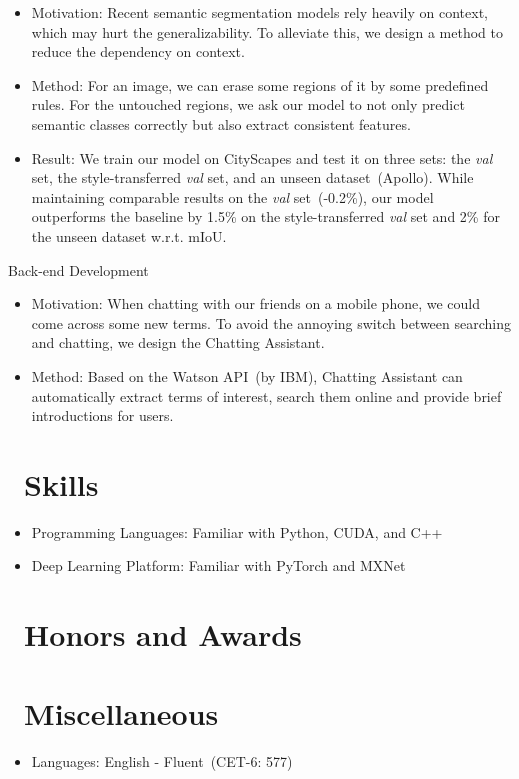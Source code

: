 \documentclass{resume}
\begin{document}
\begin{itemize}
	\item Motivation: Recent semantic segmentation models rely heavily on context, which may hurt the generalizability. To alleviate this, we design a method to reduce the dependency on context.
	\item Method: For an image, we can erase some regions of it by some predefined rules. For the untouched regions, we ask our model to not only predict semantic classes correctly but also extract consistent features.
	\item Result: We train our model on CityScapes and test it on three sets: the \textit{val} set, the style-transferred \textit{val} set, and an unseen dataset~(Apollo). While maintaining comparable results on the \textit{val} set~(-0.2\%), our model outperforms the baseline by 1.5\% on the style-transferred \textit{val} set and 2\% for the unseen dataset w.r.t. mIoU.
\end{itemize}

 {Back-end Development}
\begin{itemize}
	\item Motivation: When chatting with our friends on a mobile phone, we could come across some new terms. To avoid the annoying switch between searching and chatting, we design the Chatting Assistant. 
	\item Method: Based on the Watson API~(by IBM), Chatting Assistant can automatically extract terms of interest, search them online and provide brief introductions for users.
\end{itemize}



\section{\faCogs\ Skills}
\begin{itemize}[parsep=0.5ex]
  \item Programming Languages: Familiar with Python, CUDA, and C++
  \item Deep Learning Platform: Familiar with PyTorch and MXNet
\end{itemize}

\section{\faHeartO\ Honors and Awards}

\section{\faInfo\ Miscellaneous}
\begin{itemize}
  \item Languages: English - Fluent~(CET-6: 577)
\end{itemize}

%
%
\end{document}
